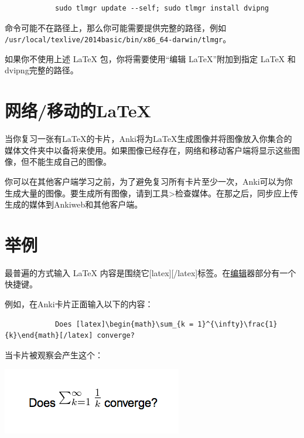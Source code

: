 \documentclass[a4paper]{book}
\begin{document}
		\begin{shaded}\begin{verbatim}
			sudo tlmgr update --self; sudo tlmgr install dvipng
			\end{verbatim}\end{shaded}
		命令可能不在路径上，那么你可能需要提供完整的路径，例如 \verb|/usr/local/texlive/2014basic/bin/x86_64-darwin/tlmgr|。
		
		
		\begin{shaded}
			如果你不使用上述 \LaTeX{} 包，你将需要使用“编辑 \LaTeX{}”附加到指定 \LaTeX{} 和dvipng完整的路径。
		\end{shaded}
		
		\section{网络/移动的\LaTeX{}}
		
		当你复习一张有\LaTeX{}的卡片，Anki将为\LaTeX{}生成图像并将图像放入你集合的媒体文件夹中以备将来使用。如果图像已经存在，网络和移动客户端将显示这些图像，但不能生成自己的图像。
		
		你可以在其他客户端学习之前，为了避免复习所有卡片至少一次，Anki可以为你生成大量的图像。要生成所有图像，请到工具>检查媒体。在那之后，同步应上传生成的媒体到Ankiweb和其他客户端。
		
		\section{举例}
		
		最普遍的方式输入 \LaTeX{} 内容是围绕它[latex][/latex]标签。在\hyperref[editor]{编辑}器部分有一个快捷键。
		
		例如，在Anki卡片正面输入以下的内容：
		
		\begin{shaded}\begin{verbatim}
			Does [latex]\begin{math}\sum_{k = 1}^{\infty}\frac{1}{k}\end{math}[/latex] converge?
			\end{verbatim}\end{shaded}
		
		当卡片被观察会产生这个：
		
		\includegraphics{figures/convergence-question.png}
		
\end{document}
